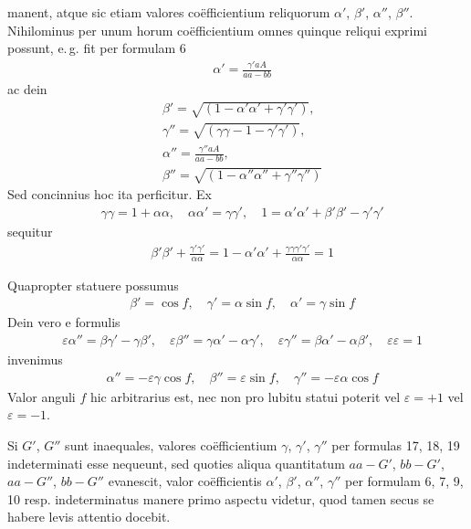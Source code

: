 manent, atque sic etiam valores coëfficientium reliquorum $\alpha'$, $\beta'$, $\alpha''$, $\beta''$. Nihilominus
per unum horum coëfficientium omnes quinque reliqui exprimi possunt,
e.\,g. fit per formulam 6
\[
\begin{aligned}
&\alpha'=\frac{\gamma'aA}{aa-bb}
\end{aligned}
\]
ac dein
\[
\begin{aligned}
&\beta'=\surd{(1-\alpha'\alpha'+\gamma'\gamma')},\\[6pt]
&
\gamma''=\surd{(\gamma\gamma-1-\gamma'\gamma')},\\[6pt]
&
\alpha''=\frac{\gamma''aA}{aa-bb},\\[6pt]
&
\beta''{}=\surd{(1-\alpha''\alpha''+\gamma''\gamma'')}
\end{aligned}
\]
Sed concinnius hoc ita perficitur. Ex
\[
\begin{aligned}
&\gamma\gamma=1+\alpha\alpha,\quad
\alpha\alpha'=\gamma\gamma',\quad
1=\alpha'\alpha'+\beta'\beta'-\gamma'\gamma'
\end{aligned}
\]
sequitur
\[
\begin{aligned}
&\beta'\beta'+\frac{\gamma'\gamma'}{\alpha\alpha}
=1-\alpha'\alpha'+\frac{\gamma\gamma\gamma'\gamma'}{\alpha\alpha}=1
\end{aligned}
\]
\par Quapropter statuere possumus
\[
\begin{aligned}
&\beta'=\cos f,\quad\gamma'=\alpha\sin f,\quad\alpha'=\gamma\sin f
\end{aligned}
\]
Dein vero e formulis
\[
\begin{aligned}
&\varepsilon\alpha''=\beta\gamma'-\gamma\beta',\quad
\varepsilon\beta''=\gamma\alpha'-\alpha\gamma',\quad
\varepsilon\gamma''=\beta\alpha'-\alpha\beta',\quad
\varepsilon\varepsilon=1
\end{aligned}
\]
invenimus
\[
\begin{aligned}
&\alpha''=-\varepsilon\gamma\cos f,\quad
\beta''=\varepsilon\sin f,\quad
\gamma''=-\varepsilon\alpha\cos f
\end{aligned}
\]
Valor anguli $f$ hic arbitrarius est, nec non pro lubitu statui poterit vel $\varepsilon=+1$
vel $\varepsilon=-1$.


Si $G'$, $G''$ sunt inaequales, valores coëfficientium $\gamma$, $\gamma'$, $\gamma''$ per formulas
17, 18, 19 indeterminati esse nequeunt, sed quoties aliqua quantitatum
\noindent{}
$aa-G'$, $bb-G'$, $aa-G''$, $bb-G''$ evanescit, valor coëfficientis $\alpha'$, $\beta'$, $\alpha''$, $\gamma''$
per formulam 6, 7, 9, 10 resp. indeterminatus manere primo aspectu videtur,
quod tamen secus se habere levis attentio docebit.

